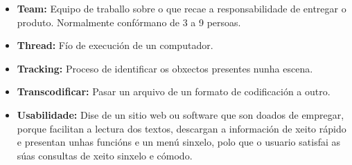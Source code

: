 \begin{itemize}
    \item \textbf{Team:} Equipo de traballo sobre o que recae a responsabilidade de entregar o 
        produto. Normalmente confórmano de 3 a 9 persoas.
    \item \textbf{Thread:} Fío de execución de un computador.
    \item \textbf{Tracking:} Proceso de identificar os obxectos presentes nunha escena.
    \item \textbf{Transcodificar:} Pasar un arquivo de un formato de codificación a outro.
    \item \textbf{Usabilidade:} Dise de un sitio web ou software que son doados de empregar, porque facilitan 
        a lectura dos textos, descargan a información de xeito rápido e presentan unhas funcións e
        un menú sinxelo, polo que o usuario satisfai as súas consultas de xeito sinxelo e cómodo.
	
\end{itemize}
